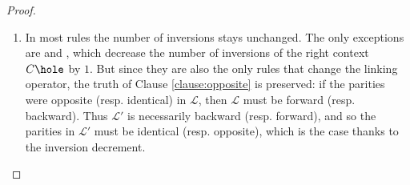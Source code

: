 \begin{proof}
\begin{enumerate}
\begin{itemize}
      \begin{enumerate}
        \setlength{\itemsep}{0.8em}
        \renewcommand{\labelenumii}{\theenumii}
        \renewcommand{\theenumii}{\arabic{enumii}.}
            
        \item In most rules the number of inversions stays unchanged. The only
        exceptions are  and , which
        decrease the number of inversions of the right context $C\hole$ by $1$.
        But since they are also the only rules that change the linking operator,
        the truth of Clause \ref{clause:opposite} is preserved: if the parities
        were opposite (resp. identical) in $\mathcal{L}$, then $\mathcal{L}$
        must be forward (resp. backward). Thus $\mathcal{L'}$ is necessarily
        backward (resp. forward), and so the parities in $\mathcal{L'}$ must be
        identical (resp. opposite), which is the case thanks to the inversion
        decrement.


\end{enumerate}
\end{itemize}
\end{enumerate}
\end{proof}
